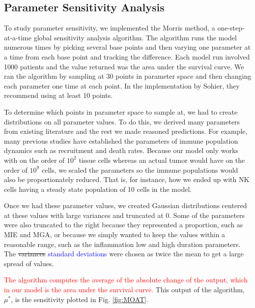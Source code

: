 \documentclass[11pt]{article}
\newcommand{\tcr} { \textcolor{red} }
\newcommand{\tcb} { \textcolor{blue} }
\begin{document}
\subsection{Parameter Sensitivity Analysis}
To study parameter sensitivity, we implemented the Morris method, a one-step-at-a-time global sensitivity analysis algorithm.
The algorithm runs the model numerous times by picking several base points and then varying one parameter at a time from each base point and tracking the difference\cite{morris1991factorial, sohier2014improvement}.
Each model run involved 1000 patients and the value returned was the area under the survival curve.
We ran the algorithm by sampling at 30 points in parameter space and then changing each parameter one time at each point.
In the implementation by Sohier, they recommend using at least 10 points\cite{sohier2014improvement}.
\par
To determine which points in parameter space to sample at, we had to create distributions on all parameter values.
To do this, we derived many parameters from existing literature and the rest we made reasoned predictions.
For example, many previous studies have established the parameters of immune population dynamics such as recruitment and death rates\cite{de2014modeling}.
Because our model only works with on the order of $10^2$ tissue cells whereas an actual tumor would have on the order of $10^9$ cells\cite{de2014modeling}, we scaled the parameters so the immune populations would also be proportionately reduced.
That is, for instance, how we ended up with NK cells having a steady state population of 10 cells in the model.
\par
Once we had these parameter values, we created Gaussian distributions centered at these values with large variances and truncated at 0.
Some of the parameters were also truncated to the right because they represented a proportion, such as MIE and MGA, or because we simply wanted to keep the values within a reasonable range, such as the inflammation low and high duration parameters.
The \sout{variances} \tcb{standard deviations} were chosen as twice the mean to get a large spread of values.
\par
\tcr{The algorithm computes the average of the absolute change of the output, which in our model is the area under the survival curve.}
This output of the algorithm, $\mu^*$, is the sensitivity plotted in Fig. \ref{fig:MOAT}.
\end{document}
